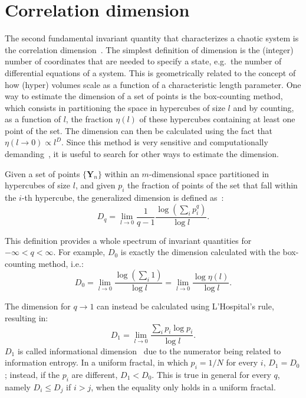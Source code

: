 \section{Correlation dimension}\label{sec: correlation dimension}

The second fundamental invariant quantity that characterizes a chaotic system is
the correlation dimension~\cite{ref:abarbanel_fourier_spectra}.
The simplest definition of dimension is the (integer) number of coordinates that are
needed to specify a state, e.g.\ the number of differential equations of a system.
This is geometrically related to the concept of how (hyper) volumes scale as a
function of a characteristic length parameter.
One way to estimate the dimension of a set of points is the box-counting method, which consists in partitioning the space in
hypercubes of size $l$ and by counting, as a function of $l$, the fraction $\eta(l)$ of
these hypercubes containing at least one point of the set. The dimension can then be calculated
using the fact that $\eta(l\rightarrow0)\propto l^D$. Since this method is
very sensitive and computationally demanding~\cite{ref:greenside1982impracticality},
it is useful to search for other ways to estimate the dimension.

Given a set of points $\{\mathbf{Y}_n\}$ within an $m$-dimensional space partitioned in hypercubes
of size $l$, and given $p_i$
the fraction of points of the set that fall within the $i$-th hypercube,
the generalized dimension is defined as~\cite{ref:fractal_dim}:
\begin{equation}
    \label{eq: generalized dimension}
    D_q=\lim_{l\rightarrow0}\frac{1}{q-1}\frac{\log(\sum_i p_i^q)}{\log l}.
\end{equation}

This definition provides a whole spectrum of invariant quantities for $-\infty<q<\infty$.
For example, $D_0$ is exactly the dimension calculated with the box-counting method, i.e.:
\begin{equation}
    \label{eq: D_0}
    D_0=\lim_{l\rightarrow0}\frac{\log(\sum_i1)}{\log l}
    =\lim_{l\rightarrow0}\frac{\log\eta(l)}{\log l}.
\end{equation}

The dimension for $q\rightarrow1$ can instead be calculated using L'Hospital's rule, resulting in:
\begin{equation}
    \label{eq: D_1}
    D_1=\lim_{l\rightarrow0}\frac{\sum_i p_i\log p_i}{\log l}.
\end{equation}
$D_1$ is called informational dimension~\cite{ref:abarbanel_fourier_spectra} due to the numerator
being related to information entropy. In a uniform fractal, in which
$p_i=1/N$ for every $i$, $D_1=D_0$; instead, if the $p_i$ are different, $D_1<D_0$.
This is true in general for every $q$, namely $D_i\leq D_j$ if $i>j$, when the equality only
holds in a uniform fractal.

